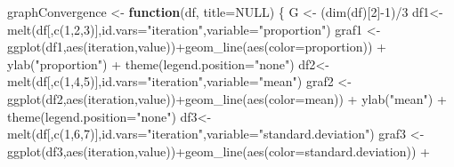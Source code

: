 \documentclass[
]{article}
\newenvironment{Shaded}{\begin{snugshade}}{\end{snugshade}}
\newcommand{\AttributeTok}[1]{\textcolor[rgb]{0.77,0.63,0.00}{#1}}
\newcommand{\ConstantTok}[1]{\textcolor[rgb]{0.00,0.00,0.00}{#1}}
\newcommand{\ControlFlowTok}[1]{\textcolor[rgb]{0.13,0.29,0.53}{\textbf{#1}}}
\newcommand{\DecValTok}[1]{\textcolor[rgb]{0.00,0.00,0.81}{#1}}
\newcommand{\FunctionTok}[1]{\textcolor[rgb]{0.00,0.00,0.00}{#1}}
\newcommand{\NormalTok}[1]{#1}
\newcommand{\OtherTok}[1]{\textcolor[rgb]{0.56,0.35,0.01}{#1}}
\newcommand{\SpecialCharTok}[1]{\textcolor[rgb]{0.00,0.00,0.00}{#1}}
\newcommand{\StringTok}[1]{\textcolor[rgb]{0.31,0.60,0.02}{#1}}
\begin{document}
\begin{Shaded}
\begin{Highlighting}[]
\NormalTok{graphConvergence }\OtherTok{\textless{}{-}} \ControlFlowTok{function}\NormalTok{(df, }\AttributeTok{title=}\ConstantTok{NULL}\NormalTok{)}
\NormalTok{\{}
\NormalTok{  G }\OtherTok{\textless{}{-}}\NormalTok{ (}\FunctionTok{dim}\NormalTok{(df)[}\DecValTok{2}\NormalTok{]}\SpecialCharTok{{-}}\DecValTok{1}\NormalTok{)}\SpecialCharTok{/}\DecValTok{3}
\NormalTok{  df1}\OtherTok{\textless{}{-}}\FunctionTok{melt}\NormalTok{(df[,}\FunctionTok{c}\NormalTok{(}\DecValTok{1}\NormalTok{,}\DecValTok{2}\NormalTok{,}\DecValTok{3}\NormalTok{)],}\AttributeTok{id.vars=}\StringTok{"iteration"}\NormalTok{,}\AttributeTok{variable=}\StringTok{"proportion"}\NormalTok{)}
\NormalTok{  graf1 }\OtherTok{\textless{}{-}} \FunctionTok{ggplot}\NormalTok{(df1,}\FunctionTok{aes}\NormalTok{(iteration,value))}\SpecialCharTok{+}\FunctionTok{geom\_line}\NormalTok{(}\FunctionTok{aes}\NormalTok{(}\AttributeTok{color=}\NormalTok{proportion))  }\SpecialCharTok{+}
    \FunctionTok{ylab}\NormalTok{(}\StringTok{"proportion"}\NormalTok{) }\SpecialCharTok{+} \FunctionTok{theme}\NormalTok{(}\AttributeTok{legend.position=}\StringTok{"none"}\NormalTok{) }
\NormalTok{  df2}\OtherTok{\textless{}{-}}\FunctionTok{melt}\NormalTok{(df[,}\FunctionTok{c}\NormalTok{(}\DecValTok{1}\NormalTok{,}\DecValTok{4}\NormalTok{,}\DecValTok{5}\NormalTok{)],}\AttributeTok{id.vars=}\StringTok{"iteration"}\NormalTok{,}\AttributeTok{variable=}\StringTok{"mean"}\NormalTok{)}
\NormalTok{  graf2 }\OtherTok{\textless{}{-}} \FunctionTok{ggplot}\NormalTok{(df2,}\FunctionTok{aes}\NormalTok{(iteration,value))}\SpecialCharTok{+}\FunctionTok{geom\_line}\NormalTok{(}\FunctionTok{aes}\NormalTok{(}\AttributeTok{color=}\NormalTok{mean))  }\SpecialCharTok{+}
    \FunctionTok{ylab}\NormalTok{(}\StringTok{"mean"}\NormalTok{) }\SpecialCharTok{+}  \FunctionTok{theme}\NormalTok{(}\AttributeTok{legend.position=}\StringTok{"none"}\NormalTok{) }
\NormalTok{  df3}\OtherTok{\textless{}{-}}\FunctionTok{melt}\NormalTok{(df[,}\FunctionTok{c}\NormalTok{(}\DecValTok{1}\NormalTok{,}\DecValTok{6}\NormalTok{,}\DecValTok{7}\NormalTok{)],}\AttributeTok{id.vars=}\StringTok{"iteration"}\NormalTok{,}\AttributeTok{variable=}\StringTok{"standard.deviation"}\NormalTok{)}
\NormalTok{  graf3 }\OtherTok{\textless{}{-}} \FunctionTok{ggplot}\NormalTok{(df3,}\FunctionTok{aes}\NormalTok{(iteration,value))}\SpecialCharTok{+}\FunctionTok{geom\_line}\NormalTok{(}\FunctionTok{aes}\NormalTok{(}\AttributeTok{color=}\NormalTok{standard.deviation))  }\SpecialCharTok{+}

\end{Highlighting}
\end{Shaded}
\end{document}

